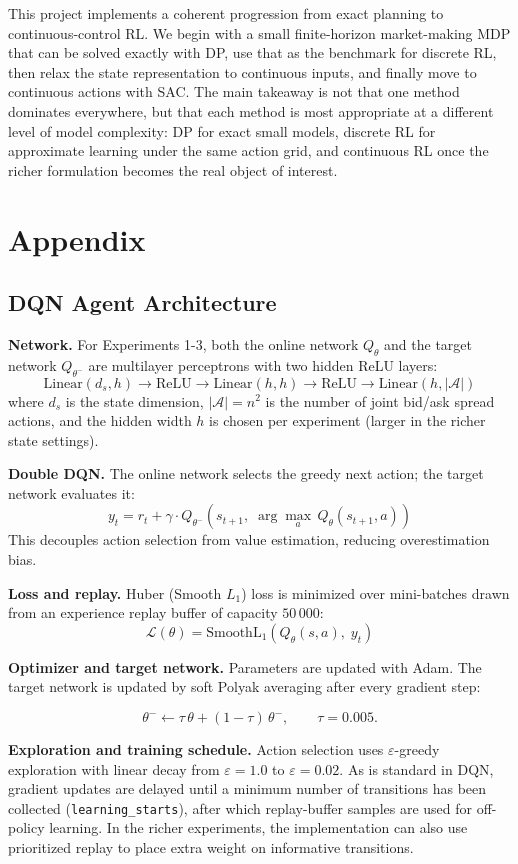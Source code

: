 \documentclass[11pt,a4paper]{article}
\begin{document}
This project implements a coherent progression from exact planning to continuous-control RL. We begin with a small finite-horizon market-making MDP that can be solved exactly with DP, use that as the benchmark for discrete RL, then relax the state representation to continuous inputs, and finally move to continuous actions with SAC. The main takeaway is not that one method dominates everywhere, but that each method is most appropriate at a different level of model complexity: DP for exact small models, discrete RL for approximate learning under the same action grid, and continuous RL once the richer formulation becomes the real object of interest.
\newpage

\section{Appendix}
\subsection{DQN Agent Architecture}

\textbf{Network.}
For Experiments 1-3, both the online network $Q_\theta$ and the target network $Q_{\theta^-}$ are multilayer perceptrons with two hidden ReLU layers:
\[
  \mathrm{Linear}(d_s, h) \to \mathrm{ReLU} \to \mathrm{Linear}(h, h) \to \mathrm{ReLU} \to \mathrm{Linear}(h, |\mathcal{A}|)
\]
where $d_s$ is the state dimension, $|\mathcal{A}| = n^2$ is the number of joint bid/ask spread actions, and the hidden width $h$ is chosen per experiment (larger in the richer state settings).

\textbf{Double DQN.}
The online network selects the greedy next action; the target network evaluates it:
\[
  y_t = r_t + \gamma \cdot Q_{\theta^-}\!\left(s_{t+1},\; \arg\max_{a}\, Q_\theta(s_{t+1}, a)\right)
\]
This decouples action selection from value estimation, reducing overestimation bias.

\textbf{Loss and replay.}
Huber (Smooth $L_1$) loss is minimized over mini-batches drawn from an experience replay buffer of capacity $50\,000$:
\[
  \mathcal{L}(\theta) = \mathrm{SmoothL_1}\!\left(Q_\theta(s, a),\; y_t\right)
\]

\textbf{Optimizer and target network.}
Parameters are updated with Adam. The target network is updated by soft Polyak averaging after every gradient step:

\[
  \theta^- \leftarrow \tau\,\theta + (1 - \tau)\,\theta^-, \qquad \tau = 0.005.
\]

\textbf{Exploration and training schedule.}
Action selection uses $\varepsilon$-greedy exploration with linear decay from $\varepsilon = 1.0$ to $\varepsilon = 0.02$. As is standard in DQN, gradient updates are delayed until a minimum number of transitions has been collected (\texttt{learning\_starts}), after which replay-buffer samples are used for off-policy learning. In the richer experiments, the implementation can also use prioritized replay to place extra weight on informative transitions.
\end{document}
